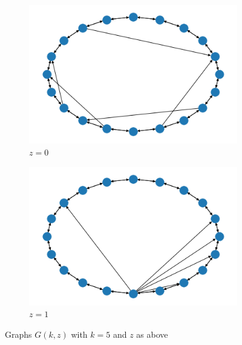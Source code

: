 \documentclass[10pt]{article}
\begin{document}
\begin{figure}[h]
\centering
\begin{subfigure}{.5\textwidth}
  \centering
  \includegraphics[width=.9\linewidth]{example2}
  \caption{$z = 0$}
\end{subfigure}%
\begin{subfigure}{.5\textwidth}
  \centering
  \includegraphics[width=.9\linewidth]{example8}
  \caption{$z = 1$}
\end{subfigure}
\caption{Graphs $G(k,z)$ with $k = 5$ and $z$ as above}
\label{fig:test}
\end{figure}
\end{document}
